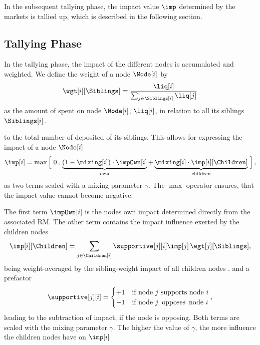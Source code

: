 \documentclass[%
aip,
amsmath,amssymb,
reprint,%
unsortedaddress,
nofootinbib
]{revtex4-2}
\newcommand{\sib}{\text{siblings}}
\begin{document}
In the subsequent tallying phase,
the impact value $\imp$ determined by the markets is tallied up,
which is described in the following section.








\subsection{Tallying Phase}\label{sec:TallyingPhase}
In the tallying phase, the impact of the different nodes is accumulated and weighted.
We define the weight of a node $\Node[i]$ by
\begin{equation}
	\wgt[i][\Siblings] = \frac{\liq[i]}{\sum_{j\in \Siblings[i]}\liq[j]}
\end{equation}
as the 
amount of \debateTokens{} spent on node $\Node[i]$, $\liq[i]$,
in relation to all its siblings $\Siblings[i]$.

to the total number of deposited \debateTokens{} of its siblings.
This allows for expressing the impact of a node $\Node[i]$ 
\begin{equation}\label{eq:Impact}
	\imp[i] = 
	\max
	\left[\vphantom{\sum}\right.
	0
	\,,\,
	\underbrace{(1-\mixing[i])\cdot\impOwn[i]}_{\text{own}} 
	+
	\underbrace{\mixing[i]\cdot\imp[i][\Children]}_{\text{children}}
	\left.\vphantom{\sum}\right],
\end{equation}
as two terms scaled with a mixing parameter $\gamma$.
The $\max$ operator ensures, that the impact value cannot become negative.


The first term $\impOwn[i]$ is the nodes own impact determined directly from the associated \ac{RM}.
The other term contains the impact influence exerted by the children nodes
\begin{equation}
	\imp[i][\Children] = \sum_{j\in \Children[i]} \supportive[j][i] \imp[j]\,\wgt[j][\Siblings],
\end{equation}
being weight-averaged by the sibling-weight impact of all children nodes
.
and a prefactor
\begin{equation}
	\supportive[j][i]=
	\begin{cases}
		+1 & \text{if node $j$ supports node $i$}\\
		-1 & \text{if node $j$ \,opposes\, node $i$}\\
	\end{cases},
\end{equation}
leading to the subtraction of impact, if the node is opposing.
Both terms are scaled with the mixing parameter $\gamma$.
The higher the value of $\gamma$, the more influence the children nodes have on $\imp[i]$
\end{document}
